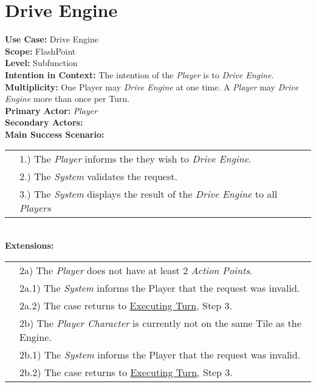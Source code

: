 \documentclass{article}
\begin{document}
	\section*{Drive Engine}
	\textbf{Use Case:} Drive Engine\\
	\textbf{Scope:} FlashPoint\\
	\textbf{Level:} Subfunction\\
	\textbf{Intention in Context:} The intention of the \textit{Player} is to \textit{Drive Engine}.\\
	\textbf{Multiplicity: } One Player may \textit{Drive Engine} at one time. A \textit{Player} may \textit{Drive Engine} more than once per Turn.\\
	\textbf{Primary Actor:} \textit{Player}\\
	\textbf{Secondary Actors:}\\
	\textbf{Main Success Scenario:}\\
	\begin{tabular}{l l}
		&1.) The \textit{Player} informs the \text{System} they wish to \textit{Drive Engine}. \\
		&2.) The \textit{System} validates the request. \\
		&3.) The \textit{System} displays the result of the \textit{Drive Engine} to all \textit{Players}
	\end{tabular}\\
	\textbf{Extensions: } \\
	\begin{tabular}{l l}
		&2a) The \textit{Player} does not have at least 2 \textit{Action Points}.\\
		&\qquad2a.1) The \textit{System} informs the Player that the request was invalid. \\
		&\qquad2a.2) The case returns to \underline{Executing Turn}, Step 3.\\
		&2b) The \textit{Player Character} is currently not on the same Tile as the Engine.\\
		&\qquad2b.1) The \textit{System} informs the Player that the request was invalid. \\
		&\qquad2b.2) The case returns to \underline{Executing Turn}, Step 3.\\
	\end{tabular}
\end{document}
